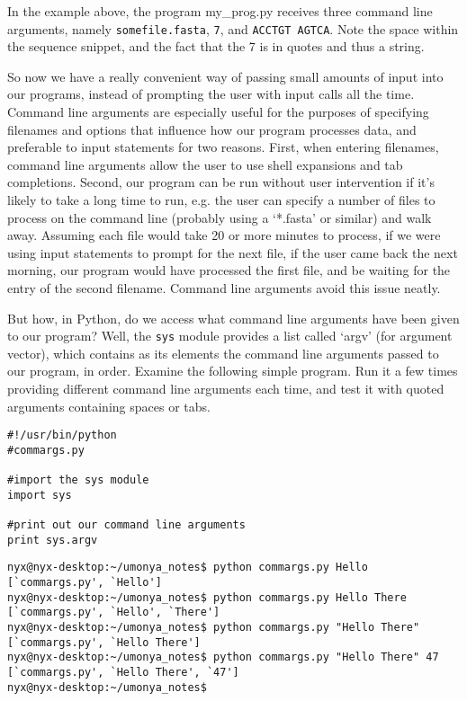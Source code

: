 In the example above, the program my\_prog.py receives three command   line arguments, namely \texttt{somefile.fasta}, \texttt{7}, and \texttt{ACCTGT AGTCA}. Note   the space within the sequence snippet, and the fact that the 7 is in   quotes and thus a string.

So now we have a really convenient way of passing small amounts of   input into our programs, instead of prompting the user with input   calls all the time. Command line arguments are especially useful for   the purposes of specifying filenames and options that influence how our   program processes data, and preferable to input statements for two   reasons. First, when entering filenames, command line arguments allow   the user to use shell expansions and tab completions. Second, our   program can be run without user intervention if it's likely to take a   long time to run, e.g. the user can specify a number of files to   process on the command line (probably using a `*.fasta' or similar) and   walk away. Assuming each file would take 20 or more minutes to process,   if we were using input statements to prompt for the next file, if   the user came back the next morning, our program would have processed   the first file, and be waiting for the entry of the second filename.   Command line arguments avoid this issue neatly.

But how, in Python, do we access what command line arguments have   been given to our program? Well, the \texttt{sys} module provides a list called   `argv' (for argument vector), which contains as its elements the   command line arguments passed to our program, in order. Examine the   following simple program. Run it a few times providing different   command line arguments each time, and test it with quoted arguments   containing spaces or tabs.
\begin{lstlisting}
#!/usr/bin/python
#commargs.py

#import the sys module
import sys

#print out our command line arguments
print sys.argv
\end{lstlisting}
\begin{lstlisting}
nyx@nyx-desktop:~/umonya_notes$ python commargs.py Hello
[`commargs.py', `Hello']
nyx@nyx-desktop:~/umonya_notes$ python commargs.py Hello There
[`commargs.py', `Hello', `There']
nyx@nyx-desktop:~/umonya_notes$ python commargs.py "Hello There"
[`commargs.py', `Hello There']
nyx@nyx-desktop:~/umonya_notes$ python commargs.py "Hello There" 47
[`commargs.py', `Hello There', `47']
nyx@nyx-desktop:~/umonya_notes$
\end{lstlisting}

